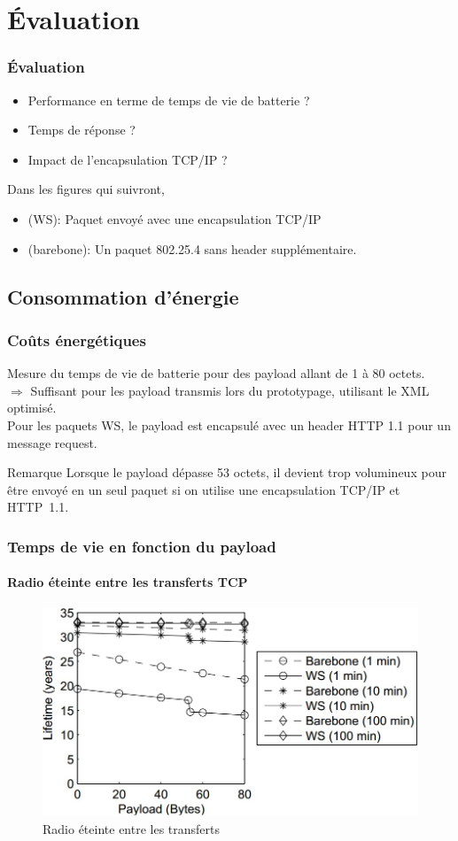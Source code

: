 \section{Évaluation}
\begin{frame}
\frametitle{Évaluation}
\begin{itemize}
 \item Performance en terme de temps de vie de batterie ?
 \item Temps de réponse ?
 \item Impact de l'encapsulation TCP/IP ?
\end{itemize}
\vspace{5mm}
Dans les figures qui suivront,
\begin{itemize}
 \item (WS): Paquet envoyé avec une encapsulation TCP/IP %
 \item (barebone): Un paquet 802.25.4 sans header supplémentaire.
\end{itemize}
\end{frame}

\subsection{Consommation d'énergie}
\begin{frame}
 \frametitle{Coûts énergétiques}
 Mesure du temps de vie de batterie pour des payload allant de 1 à 80 octets.\\
 $\Rightarrow$ Suffisant pour les payload transmis lors du prototypage, utilisant le XML optimisé.\\
 Pour les paquets WS, le payload est encapsulé avec un header HTTP 1.1 pour un message request.
 \begin{block}{Remarque}
  Lorsque le payload dépasse 53 octets, il devient trop volumineux pour être envoyé en un seul paquet si on utilise une encapsulation TCP/IP et HTTP~1.1.
 \end{block}
\end{frame}

\def \radiosca {0.4}
\begin{frame}
 \frametitle{Temps de vie en fonction du payload}
 \framesubtitle{Radio éteinte entre les transferts TCP}
 \begin{figure}
  \centering
  \includegraphics[scale=\radiosca]{figures/radiooff.jpg}
  \caption{Radio éteinte entre les transferts}
 \end{figure} 
\end{frame}

